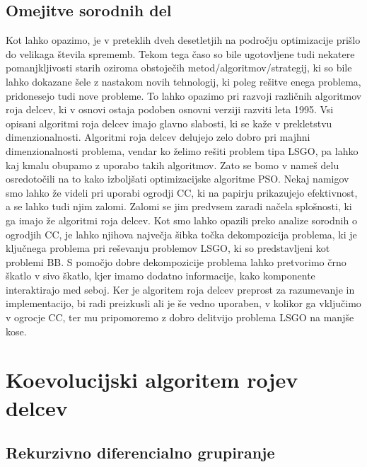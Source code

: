 \section{Omejitve sorodnih del}

Kot lahko opazimo, je v preteklih dveh desetletjih na področju optimizacije prišlo do velikaga števila sprememb.
Tekom tega časo so bile ugotovljene tudi nekatere pomanjkljivosti starih oziroma obstoječih metod/algoritmov/strategij, ki so bile lahko dokazane šele z nastakom novih tehnologij, ki poleg rešitve enega problema, pridonesejo tudi nove probleme.
To lahko opazimo pri razvoji različnih algoritmov roja delcev, ki v osnovi ostaja podoben osnovni verziji razviti leta 1995.
Vsi opisani algoritmi roja delcev imajo glavno slabosti, ki se kaže v prekletstvu dimenzionalnosti.
Algoritmi roja delcev delujejo zelo dobro pri majhni dimenzionalnosti problema, vendar ko želimo rešiti problem tipa LSGO, pa lahko kaj kmalu obupamo z uporabo takih algoritmov.
Zato se bomo v nameš delu osredotočili na to kako izboljšati optimizacijske algoritme PSO.
Nekaj namigov smo lahko že videli pri uporabi ogrodji CC, ki na papirju prikazujejo efektivnost, a se lahko tudi njim zalomi.
Zalomi se jim predvsem zaradi načela splošnosti, ki ga imajo že algoritmi roja delcev.
Kot smo lahko opazili preko analize sorodnih o ogrodjih CC, je lahko njihova največja šibka točka dekompozicija problema, ki je ključnega problema pri reševanju problemov LSGO, ki so predstavljeni kot problemi BB.
S pomočjo dobre dekompozicije problema lahko pretvorimo črno škatlo v sivo škatlo, kjer imamo dodatno informacije, kako komponente interaktirajo med seboj.
Ker je algoritem roja delcev preprost za razumevanje in implementacijo, bi radi preizkusli ali je še vedno uporaben, v kolikor ga vključimo v ogrocje CC, ter mu pripomoremo z dobro delitvijo problema LSGO na manjše kose.

\chapter{Koevolucijski algoritem rojev delcev}\label{chap:algo}


\section{Rekurzivno diferencialno grupiranje}

